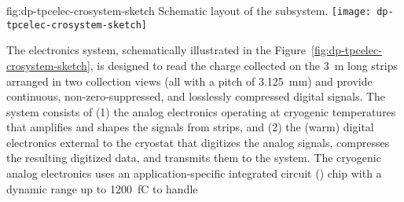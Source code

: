 \begin{dunefigure}{fig:dp-tpcelec-crosystem-sketch}
{Schematic layout of the   subsystem.}
\texttt{[image: dp-tpcelec-crosystem-sketch]}
\end{dunefigure}

The  electronics system, schematically illustrated in the Figure~\ref{fig:dp-tpcelec-crosystem-sketch}, is designed to read the charge collected on the \SI{3}{m} long  strips arranged in two collection views (all with a pitch of \SI{3.125}{mm}) and 
provide continuous, non-zero-suppressed, and losslessly compressed digital signals.  
The system consists of (1) the  analog electronics operating at cryogenic temperatures that amplifies and shapes the signals from  strips, and (2) the (warm) digital electronics external to the cryostat that digitizes the analog signals, compresses the resulting digitized data, and transmits them to the  system.  The cryogenic  analog electronics uses an application-specific integrated circuit () chip with a dynamic range up to \SI{1200}{fC} to handle %
